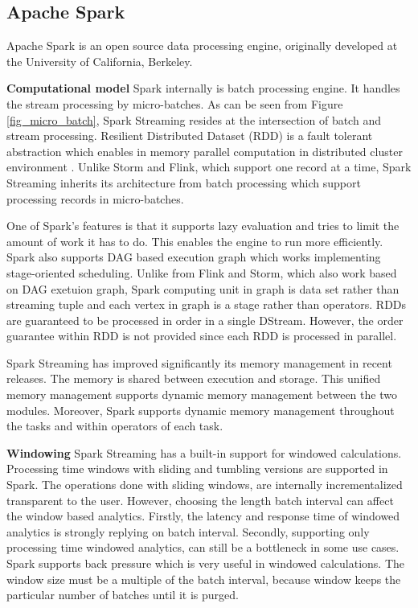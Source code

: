 \documentclass{vldb}
\begin{document}
\subsection{Apache Spark}
Apache Spark is an open source data processing engine, originally developed at the University of California, Berkeley. 

\textbf{Computational model}
Spark internally is batch processing engine. It handles the stream processing by micro-batches. As can be seen from Figure \ref{fig_micro_batch},  Spark Streaming resides at the intersection of batch and stream processing.  Resilient Distributed Dataset (RDD) is a fault tolerant abstraction which enables in memory parallel computation in  distributed cluster environment \cite{zaharia2012resilient}. Unlike Storm and Flink, which support one record at a time, Spark Streaming inherits its architecture from batch processing which support processing records in micro-batches. 

One of Spark's features is that it supports lazy evaluation and tries to  limit the amount of work it has to do. This enables the engine to run more efficiently. Spark also supports DAG based execution graph which works implementing  stage-oriented scheduling. Unlike from Flink and Storm, which also work based on DAG exetuion graph, Spark computing unit in graph is data set rather than streaming tuple and each vertex in graph is a stage rather than operators. RDDs are guaranteed to be processed in order in a single DStream. However, the order guarantee within RDD is not provided since each RDD is processed in parallel. 

Spark Streaming has improved significantly its memory management in recent releases.  The memory is shared between execution and storage. This unified memory management supports dynamic memory management between the two modules. Moreover, Spark supports dynamic memory management throughout the tasks and within operators of each task. 

\textbf{Windowing}
Spark Streaming has a built-in support for windowed calculations. Processing time windows with sliding and tumbling versions are  supported in Spark. The operations done with sliding windows, are internally incrementalized transparent to the user.  However, choosing the length batch interval can affect the window based analytics. Firstly, the latency and response time of windowed analytics is strongly replying on batch interval. Secondly, supporting only processing time windowed analytics, can still be a bottleneck in some use cases. Spark supports back pressure which is very useful in windowed calculations. The window size must be a multiple of the batch interval, because window keeps the particular number of batches until it is purged. 
\end{document}

